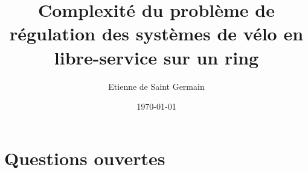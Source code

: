\documentclass[twoside,11pt,openany,a4paper]{rapport}
\begin{document}
\title{Complexité du problème de régulation des systèmes de vélo en libre-service sur un ring}
\author{Etienne de Saint Germain}
\date{\today}



\cleardoublepage







\tableofcontents
{}
\listoffigures
{}



\cleardoublepage











\chapter{Questions ouvertes}






\backmatter
\end{document}
